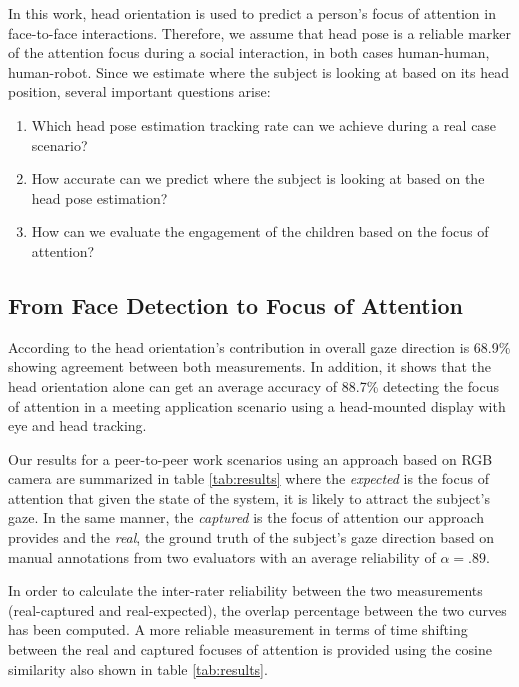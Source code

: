 \documentclass{sig-alternate}
\begin{document}
In this work, head orientation is used to predict a person's focus of attention in face-to-face interactions. Therefore, we assume that head pose is a reliable marker of the attention focus during a social interaction, in both cases human-human, human-robot. Since we estimate where the subject is looking at based on its head position, several important questions arise:

\begin{enumerate}
\item Which head pose estimation tracking rate can we achieve during a real case scenario?  
\item How accurate can we predict where the subject is looking at based on the head pose estimation?
\item How can we evaluate the engagement of the children based on the focus of attention?\newline
\end{enumerate}

\subsection{From Face Detection to Focus of Attention} \label{fromFaceTo}

According to \cite{stiefelhagen2002tracking} the head orientation's contribution in overall gaze direction is 68.9\% showing agreement between both measurements. In addition, it shows that the head orientation alone can get an average accuracy of 88.7\% detecting the focus of attention in a meeting application scenario using a head-mounted display with eye and head tracking.

Our results for a peer-to-peer work scenarios using an approach based on RGB camera are summarized in table \ref{tab:results} where the \textit{expected} is the focus of attention that given the state of the system, it is likely to attract the subject's gaze. In the same manner, the \textit{captured} is the focus of attention our approach provides and the \textit{real}, the ground truth of the subject's gaze direction based on manual annotations from two evaluators with an average reliability of $ \alpha = .89 $.

In order to calculate the inter-rater reliability between the two measurements (real-captured and real-expected), the overlap percentage between the two curves has been computed. A more reliable measurement in terms of time shifting between the real and captured focuses of attention is provided using the cosine similarity also shown in table \ref{tab:results}. 
\end{document}
